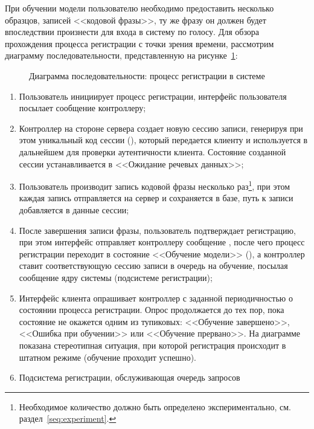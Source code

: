 При обучении модели пользователю необходимо предоставить несколько образцов,
записей <<кодовой фразы>>, ту же фразу он должен будет впоследствии произнести
для входа в систему по голосу. Для обзора прохождения процесса регистрации с
точки зрения времени, рассмотрим диаграмму последовательности, представленную на
рисунке~\ref{fig:seq_enrollment}:

\begin{figure}[hp!]
    \center{
        \fontsize{12}{14}\selectfont
        
    }
    \caption{Диаграмма последовательности: процесс регистрации в системе}
    \label{fig:seq_enrollment}
\end{figure}

\begin{enumerate}
\item Пользователь инициирует процесс регистрации, интерфейс пользователя
посылает сообщение  контроллеру;
\item Контроллер на стороне сервера создает новую сессию записи, генерируя при
этом уникальный код сессии (), который передается клиенту и
используется в дальнейшем для проверки аутентичности клиента. Состояние
созданной сессии устанавливается в <<Ожидание речевых данных>>;
\item Пользователь производит запись кодовой фразы несколько
раз\footnote{Необходимое количество должно быть определено экспериментально, см.
раздел~\ref{seq:experiment}.}, при этом каждая запись отправляется на сервер и
сохраняется в базе, путь к записи добавляется в данные сессии;
\item После завершения записи фразы, пользователь подтверждает регистрацию, при
этом интерфейс отправляет контроллеру сообщение , после чего
процесс регистрации переходит в состояние <<Обучение модели>> (),
а контроллер ставит соответствующую сессию записи в очередь на обучение, посылая
сообщение  ядру системы (подсистеме регистрации);
\item Интерфейс клиента опрашивает контроллер с заданной периодичностью о
состоянии процесса регистрации. Опрос продолжается до тех пор, пока состояние не
окажется одним из тупиковых: <<Обучение завершено>>, <<Ошибка при обучении>> или
<<Обучение прервано>>. На диаграмме показана стереотипная ситуация, при которой
регистрация происходит в штатном режиме (обучение проходит успешно).
\item \label{enum:enroll} Подсистема регистрации, обслуживающая очередь запросов

\end{enumerate}
